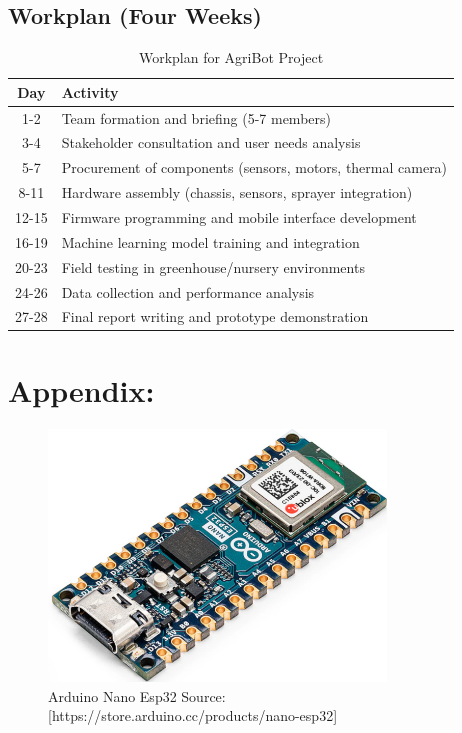 \documentclass[12pt,a4paper]{report}
\begin{document}
\section{Workplan (Four Weeks)}
\begin{spacing}{1.5}
\begin{table}[H]
\centering
\renewcommand{\arraystretch}{1.5}
\begin{tabular}{|c|l|}
\hline
\textbf{Day} & \textbf{Activity} \\
\hline
1-2 & Team formation and briefing (5-7 members) \\
\hline
3-4 & Stakeholder consultation and user needs analysis \\
\hline
5-7 & Procurement of components (sensors, motors, thermal camera) \\
\hline
8-11 & Hardware assembly (chassis, sensors, sprayer integration) \\
\hline
12-15 & Firmware programming and mobile interface development \\
\hline
16-19 & Machine learning model training and integration \\
\hline
20-23 & Field testing in greenhouse/nursery environments \\
\hline
24-26 & Data collection and performance analysis \\
\hline
27-28 & Final report writing and prototype demonstration \\
\hline
\end{tabular}
\caption{Workplan for AgriBot Project}
\end{table}
\end{spacing}

\renewcommand{\bibname}{References}



\appendix
\chapter*{Appendix:}

\begin{figure}[H]
    \centering
    \includegraphics[width=0.8\textwidth]{img/Arduino Nano Esp32 (Original).png}
    \caption{Arduino Nano Esp32 Source: [https://store.arduino.cc/products/nano-esp32]}
\end{figure}
\end{document}
